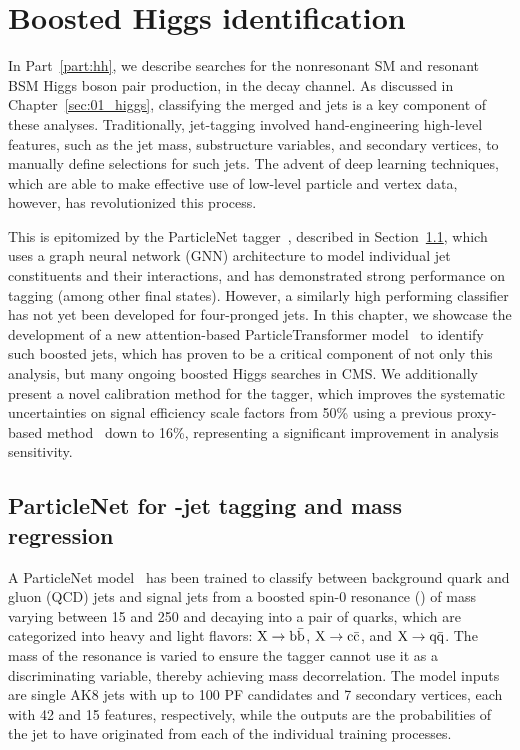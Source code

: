\chapter{Boosted Higgs identification}
\label{sec:05_jet_tagging}

In Part~\ref{part:hh}, we describe searches for the nonresonant SM and resonant BSM Higgs boson pair production, in the \bbvvq decay channel.
As discussed in Chapter~\ref{sec:01_higgs}, classifying the merged \hbb and \hyvv jets is a key component of these analyses.
Traditionally, jet-tagging involved hand-engineering high-level features, such as the jet mass, substructure variables, and secondary vertices, to manually define selections for such jets.
The advent of deep learning techniques, which are able to make effective use of low-level particle and vertex data, however, has revolutionized this process.

This is epitomized by the ParticleNet tagger~\cite{Qu:2019gqs}, described in Section~\ref{sec:05_hbb_tagger}, which uses a graph neural network (GNN) architecture to model individual jet constituents and their interactions, and has demonstrated strong performance on \hbb tagging (among other final states).
However, a similarly high performing classifier has not yet been developed for four-pronged \VVq jets.
In this chapter, we showcase the development of a new attention-based ParticleTransformer model~\cite{Qu:2022mxj} to identify such boosted \hvvq jets, which has proven to be a critical component of not only this analysis, but many ongoing boosted Higgs searches in CMS.
We additionally present a novel calibration method for the \hyvv tagger, which improves the systematic uncertainties on signal efficiency scale factors from 50\% using a previous proxy-based method~\cite{CMS:2022lqh} down to 16\%, representing a significant improvement in analysis sensitivity.


\section{ParticleNet for \texorpdfstring{\bbbar}{bb}-jet tagging and mass regression}
\label{sec:05_hbb_tagger}

A ParticleNet model~\cite{CMS-DP-2020-002} has been trained to classify between background quark and gluon (QCD) jets and signal jets from a boosted spin-0 resonance (\PX) of mass varying between 15 and 250 \GeV and decaying into a pair of quarks, which are categorized into heavy and light flavors: $\textrm{X}\to\textrm{b}\bar{\textrm{b}}$, $\textrm{X}\to\textrm{c}\bar{\textrm{c}}$, and $\textrm{X}\to\textrm{q}\bar{\textrm{q}}$.
The mass of the resonance is varied to ensure the tagger cannot use it as a discriminating variable, thereby achieving mass decorrelation.
The model inputs are single AK8 jets with up to 100 PF candidates and 7 secondary vertices, each with 42 and 15 features, respectively, while the outputs are the probabilities of the jet to have originated from each of the individual training processes.

